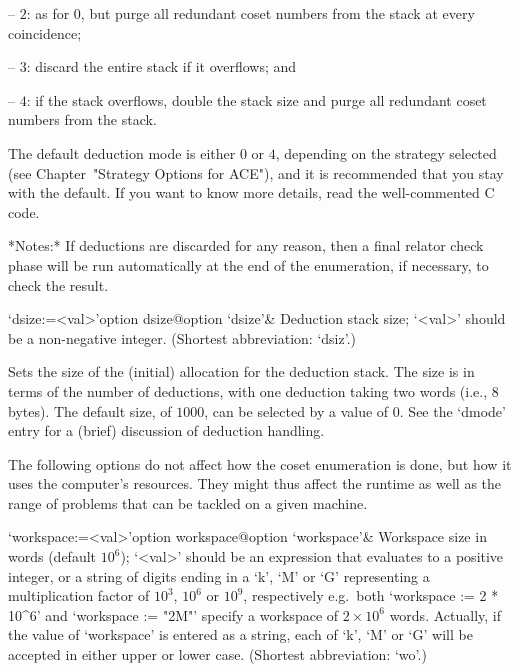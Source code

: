 \item{--} $2$: 
as for 0, but purge all redundant coset  numbers  from  the  stack  at
every coincidence;

\item{--} $3$:
discard the entire stack if it overflows; and

\item{--} $4$:
if the stack overflows, double the stack size and purge all  redundant
coset numbers from the stack.

\endlist

The default deduction mode is either $0$  or  $4$,  depending  on  the
strategy selected (see Chapter~"Strategy Options for ACE"), and it  is
recommended that you stay with the default. If you want to  know  more
details, read the well-commented C code.

*Notes:*
If deductions are discarded for any reason, then a final relator check
phase  will be run  automatically at  the end  of the  enumeration, if
necessary, to check the result.

\>`dsize:=<val>'{option dsize}@{option `dsize'}&
Deduction stack size; `<val>' should be a non-negative integer.
(Shortest abbreviation: `dsiz'.)

Sets the  size of  the (initial) allocation  for the  deduction stack.
The size is  in terms of the number of  deductions, with one deduction
taking two words (i.e., 8 bytes).  The default size, of $1000$, can be
selected  by  a value  of  0.   See the  `dmode' entry  for a  (brief)
discussion of deduction handling.

\enditems


The following options do not affect how the coset enumeration is done,
but how it  uses the computer's resources. They  might thus affect the
runtime as  well as  the range of  problems that  can be tackled  on a
given machine.

\beginitems

\>`workspace:=<val>'{option workspace}@{option `workspace'}&
Workspace size in words (default $10^6$);
`<val>' should be an expression that evaluates to a positive  integer,
or a string of digits ending in a  `k',  `M'  or  `G'  representing  a
multiplication  factor  of  $10^3$,  $10^6$  or  $10^9$,  respectively
e.g.~both `workspace := 2 * 10^6' and `workspace :=  "2M"'  specify  a
workspace  of  $2\times10^6$  words.  Actually,  if   the   value   of
`workspace' is entered as a string, each of `k', `M' or  `G'  will  be
accepted in either upper or lower case. (Shortest abbreviation: `wo'.)

